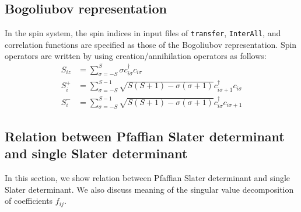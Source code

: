 \chapter{}
\label{Ch:algorithm}
\section{Bogoliubov representation}\label{sec_bogoliubov_rep}

In the spin system,
the spin indices in input files of \verb|transfer|, \verb|InterAll|,
and correlation functions are specified as those of the Bogoliubov representation.
Spin operators are written by using creation/annihilation operators as follows:
\begin{align}
  S_{i z} &= \sum_{\sigma = -S}^{S} \sigma c_{i \sigma}^\dagger c_{i \sigma}
  \\
  S_{i}^+ &= \sum_{\sigma = -S}^{S-1} 
  \sqrt{S(S+1) - \sigma(\sigma+1)} 
  c_{i \sigma+1}^\dagger c_{i \sigma}
  \\
  S_{i}^- &= \sum_{\sigma = -S}^{S-1} 
  \sqrt{S(S+1) - \sigma(\sigma+1)} 
  c_{i \sigma}^\dagger c_{i \sigma+1}
\end{align}

\section{Relation between Pfaffian Slater determinant and single Slater determinant}
\label{sec:PuffAndSlater}
In this section, we show relation between Pfaffian Slater determinant and single Slater determinant.
We also discuss meaning of the singular value decomposition of coefficients $f_{ij}$. 
